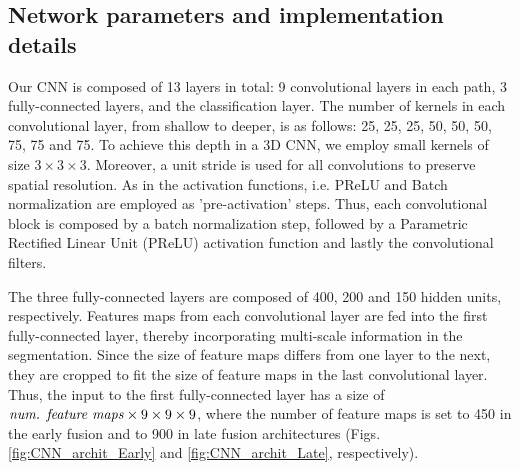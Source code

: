 \documentclass[twoside,espcrc2]{elsarticle}
\newcommand{\tx}[1]{\textrm{#1}}
\newcommand{\vold}[1]{$#1\!\times\!#1\!\times\!#1$}
\begin{document}
\subsection{Network parameters and implementation details} 

Our CNN is composed of 13 layers in total: 9 convolutional layers in each path, 3 fully-connected layers, and the classification layer. The number of kernels in each convolutional layer, from shallow to deeper, is as follows: 25, 25, 25, 50, 50, 50, 75, 75 and 75. To achieve this depth in a 3D CNN, we employ small kernels of size \vold{3}. Moreover, a unit stride is used for all convolutions to preserve spatial resolution. As in \cite{he2016identity} the activation functions, i.e. PReLU and Batch normalization are employed as 'pre-activation' steps. Thus, each convolutional block is composed by a batch normalization step, followed by a Parametric Rectified Linear Unit (PReLU) activation function and lastly the convolutional filters.

The three fully-connected layers are composed of 400, 200 and 150 hidden units, respectively. Features maps from each convolutional layer are fed into the first fully-connected layer, thereby incorporating multi-scale information in the segmentation. Since the size of feature maps differs from one layer to the next, they are cropped to fit the size of feature maps in the last convolutional layer. Thus, the input to the first fully-connected layer has a size of $\tx{\emph{num. feature maps}} \times  9 \times 9 \times 9$, where the number of feature maps is set to 450 in the early fusion and to 900 in late fusion architectures (Figs. \ref{fig:CNN_archit_Early} and \ref{fig:CNN_archit_Late}, respectively).
\end{document}
